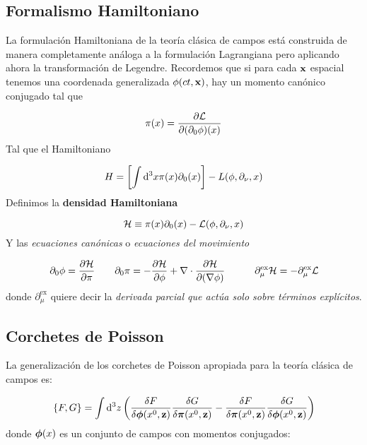 \subsection{Formalismo Hamiltoniano}

La formulación Hamiltoniana de la teoría clásica de campos está construida de manera completamente análoga a la formulación Lagrangiana pero aplicando ahora la transformación de Legendre. Recordemos que si para cada $\mathbf{x}$ espacial tenemos una coordenada generalizada $\phi(ct,\mathbf{x})$, hay un momento canónico conjugado tal que 

\begin{equation}
	\pi (x) = \frac{\partial \mathcal{L}}{\partial (\partial_0 \phi)(x)}
\end{equation}
Tal que el Hamiltoniano

\begin{equation}
	H = \left[ \int \mathrm{d}^3 x \pi(x)\partial_0 (x) \right] - L (\phi,\partial_\nu,x) 
\end{equation}
Definimos la \textbf{densidad Hamiltoniana}

\begin{equation}
	\mathcal{H} \equiv \pi(x)\partial_0 (x) - \mathcal{L} (\phi,\partial_\nu,x) 
\end{equation}
Y las \textit{ecuaciones canónicas} o \textit{ecuaciones del movimiento}

\begin{equation}
	\partial_0 \phi = \frac{\partial \mathcal{H}}{\partial \pi} \qquad \partial_0 \pi = - \frac{\partial \mathcal{H}}{\partial \phi} + \nabla \cdot \frac{\partial \mathcal{H}}{\partial (\nabla \phi)} \quad \quad \quad \partial_\mu^{\text{ex}} \mathcal{H} = -\partial_\mu^{\text{ex}} \mathcal{L} 
\end{equation}
donde $\partial_\mu^{\text{ex}}$ quiere decir la \textit{derivada parcial que actúa solo sobre términos explícitos}. 

\subsection{Corchetes de Poisson}

La generalización de los corchetes de Poisson apropiada para la teoría clásica de campos es:

\begin{equation}
	\{F,G\} = \int \mathrm{d}^3 z \left( \frac{\delta F}{\delta \boldsymbol{\phi} (x^0,\mathbf{z})}  \frac{\delta G}{\delta \boldsymbol{\pi} (x^0,\mathbf{z})} - \frac{\delta F}{\delta \boldsymbol{\pi} (x^0,\mathbf{z})} \frac{\delta G}{\delta \boldsymbol{\phi} (x^0,\mathbf{z})}  \right)
\end{equation}
donde $\boldsymbol{\phi}(x)$ es un conjunto de campos con momentos conjugados:

